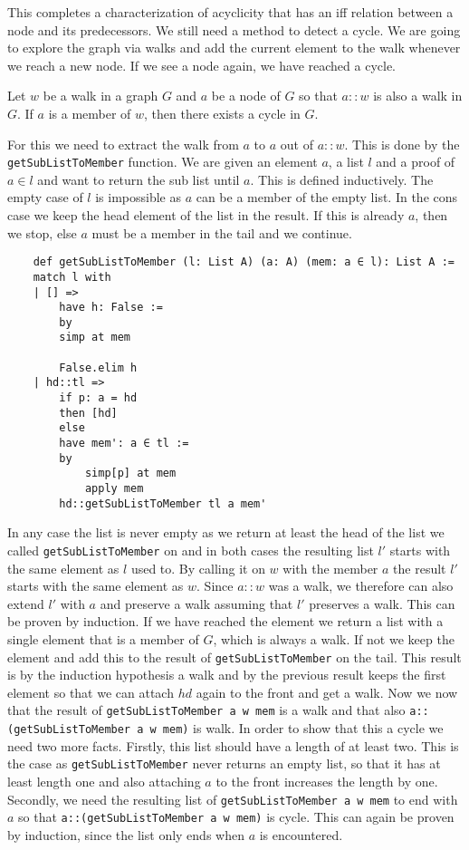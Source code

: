 This completes a characterization of acyclicity that has an iff relation between a node and its predecessors. We still need a method to detect a cycle. We are going to explore the graph via walks and add the current element to the walk whenever we reach a new node. If we see a node again, we have reached a cycle.

\begin{lemma}
    Let $w$ be a walk in a graph $G$ and $a$ be a node of $G$ so that $a::w$ is also a walk in $G$. If $a$ is a member of $w$, then there exists a cycle in $G$.
\end{lemma}

For this we need to extract the walk from $a$ to $a$ out of $a::w$. This is done by the \texttt{getSubListToMember} function. We are given an element $a$, a list $l$ and a proof of $a\in l$ and want to return the sub list until $a$. This is defined inductively. The empty case of $l$ is impossible as $a$ can be a member of the empty list. In the cons case we keep the head element of the list in the result. If this is already $a$, then we stop, else $a$ must be a member in the tail and we continue.

\begin{lstlisting}
    def getSubListToMember (l: List A) (a: A) (mem: a ∈ l): List A :=
    match l with
    | [] =>
        have h: False :=
        by
        simp at mem

        False.elim h
    | hd::tl =>
        if p: a = hd
        then [hd]
        else
        have mem': a ∈ tl :=
        by
            simp[p] at mem
            apply mem
        hd::getSubListToMember tl a mem'
\end{lstlisting}

In any case the list is never empty as we return at least the head of the list we called \texttt{getSubListToMember} on and in both cases the resulting list $l'$ starts with the same element as $l$ used to. By calling it on $w$ with the member $a$ the result $l'$ starts with the same element as $w$. Since $a::w$ was a walk, we therefore can also extend $l'$ with $a$ and preserve a walk assuming that $l'$ preserves a walk. This can be proven by induction. If we have reached the element we return a list with a single element that is a member of $G$, which is always a walk. If not we keep the element and add this to the result of \texttt{getSubListToMember} on the tail. This result is by the induction hypothesis a walk and by the previous result keeps the first element so that we can attach $hd$ again to the front and get a walk. Now we now that the result of \texttt{getSubListToMember a w mem} is a walk and that also \texttt{a::(getSubListToMember a w mem)} is walk. 
In order to show that this a cycle we need two more facts. Firstly, this list should have a length of at least two. This is the case as \texttt{getSubListToMember} never returns an empty list, so that it has at least length one and also attaching $a$ to the front increases the length by one. Secondly, we need the resulting list of \texttt{getSubListToMember a w mem} to end with $a$ so that \texttt{a::(getSubListToMember a w mem)} is cycle. This can again be proven by induction, since the list only ends when $a$ is encountered. 

